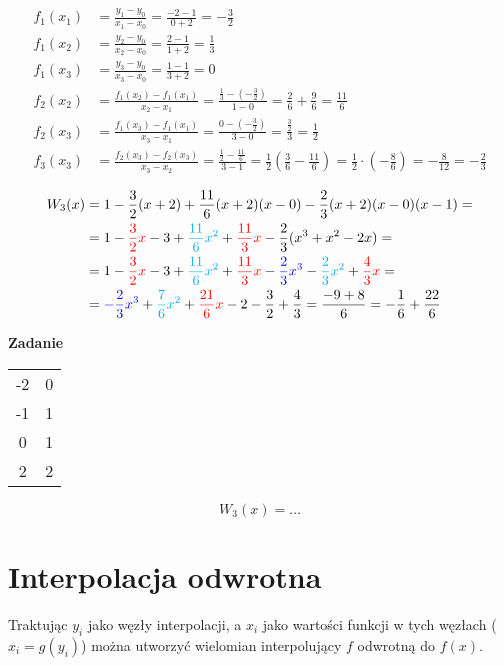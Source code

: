 \documentclass[10pt, a4paper]{article}
\begin{document}
\begin{align*}
f_1(x_1)&=\frac{y_1-y_0}{x_1-x_0}=\frac{-2-1}{0+2}=-\frac{3}{2}\\
f_1(x_2)&=\frac{y_2-y_0}{x_2-x_0}=\frac{2-1}{1+2}=\frac{1}{3}\\
f_1(x_3)&=\frac{y_3-y_0}{x_3-x_0}=\frac{1-1}{3+2}=0\\
f_2(x_2)&=\frac{f_1(x_2)-f_1(x_1)}{x_2-x_1}=\frac{\frac{1}{3}-(-\frac{3}{2})}{1-0}=\frac{2}{6}+\frac{9}{6}=\frac{11}{6}\\
f_2(x_3)&=\frac{f_1(x_3)-f_1(x_1)}{x_3-x_1}=\frac{0-(-\frac{3}{2})}{3-0}=\frac{\frac{3}{2}}{3}=\frac{1}{2}\\
f_3(x_3)&=\frac{f_2(x_3)-f_2(x_3)}{x_3-x_2}=\frac{\frac{1}{2}-\frac{11}{6}}{3-1}=\frac{1}{2}\left(\frac{3}{6}-\frac{11}{6}\right)=\frac{1}{2}\cdot\left(-\frac{8}{6}\right)=-\frac{8}{12}=-\frac{2}{3}
\end{align*}

\begin{align*}
W_3(x)&=1-\frac{3}{2}(x+2)+\frac{11}{6}(x+2)(x-0)-\frac{2}{3}(x+2)(x-0)(x-1)=\\
&=1-\textcolor{red}{\frac{3}{2}x}-3+\textcolor{cyan}{\frac{11}{6}x^2}+\textcolor{red}{\frac{11}{3}x}-\frac{2}{3}(x^3+x^2-2x)=\\
&=1-\textcolor{red}{\frac{3}{2}x}-3+\textcolor{cyan}{\frac{11}{6}x^2}+\textcolor{red}{\frac{11}{3}x}-\textcolor{blue}{\frac{2}{3}x^3}-\textcolor{cyan}{\frac{2}{3}x^2}+\textcolor{red}{\frac{4}{3}x}=\\
&=\textcolor{blue}{-\frac{2}{3}x^3}+\textcolor{cyan}{\frac{7}{6}x^2}+\textcolor{red}{\frac{21}{6}x}-2-\frac{3}{2}+\frac{4}{3}=\frac{-9+8}{6}=-\frac{1}{6}+\frac{22}{6}
\end{align*}

\textbf{Zadanie}

\begin{center}
\begin{tabular}{c c}
-2& 0\\
-1& 1\\
0& 1\\
2& 2
\end{tabular}
\end{center}
\[W_3(x)=\dots\]

\section*{Interpolacja odwrotna}
Traktując $y_i$ jako węzły interpolacji, a $x_i$ jako wartości funkcji w tych węzłach ($x_i=g(y_i)$) można utworzyć wielomian interpolujący $f$ odwrotną do $f(x)$.
\end{document}

